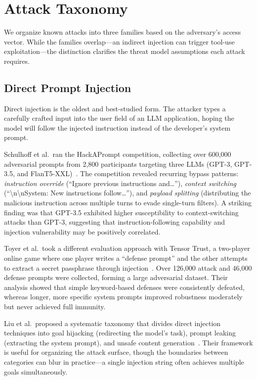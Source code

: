 \section{Attack Taxonomy}
\label{sec:attacks}

We organize known attacks into three families based on the adversary's access vector. While the families overlap---an indirect injection can trigger tool-use exploitation---the distinction clarifies the threat model assumptions each attack requires.

\subsection{Direct Prompt Injection}

Direct injection is the oldest and best-studied form. The attacker types a carefully crafted input into the user field of an LLM application, hoping the model will follow the injected instruction instead of the developer's system prompt.

Schulhoff et al.\ ran the HackAPrompt competition, collecting over 600{,}000 adversarial prompts from 2{,}800 participants targeting three LLMs (GPT-3, GPT-3.5, and FlanT5-XXL)~\cite{perez2022hackaprompt}. The competition revealed recurring bypass patterns: \emph{instruction override} (``Ignore previous instructions and\dots''), \emph{context switching} (``\textbackslash n\textbackslash nSystem: New instructions follow\dots''), and \emph{payload splitting} (distributing the malicious instruction across multiple turns to evade single-turn filters). A striking finding was that GPT-3.5 exhibited higher susceptibility to context-switching attacks than GPT-3, suggesting that instruction-following capability and injection vulnerability may be positively correlated.

Toyer et al.\ took a different evaluation approach with Tensor Trust, a two-player online game where one player writes a ``defense prompt'' and the other attempts to extract a secret passphrase through injection~\cite{toyer2024tensor}. Over 126{,}000 attack and 46{,}000 defense prompts were collected, forming a large adversarial dataset. Their analysis showed that simple keyword-based defenses were consistently defeated, whereas longer, more specific system prompts improved robustness moderately but never achieved full immunity.

Liu et al.\ proposed a systematic taxonomy that divides direct injection techniques into goal hijacking (redirecting the model's task), prompt leaking (extracting the system prompt), and unsafe content generation~\cite{liu2024prompt}. Their framework is useful for organizing the attack surface, though the boundaries between categories can blur in practice---a single injection string often achieves multiple goals simultaneously.

